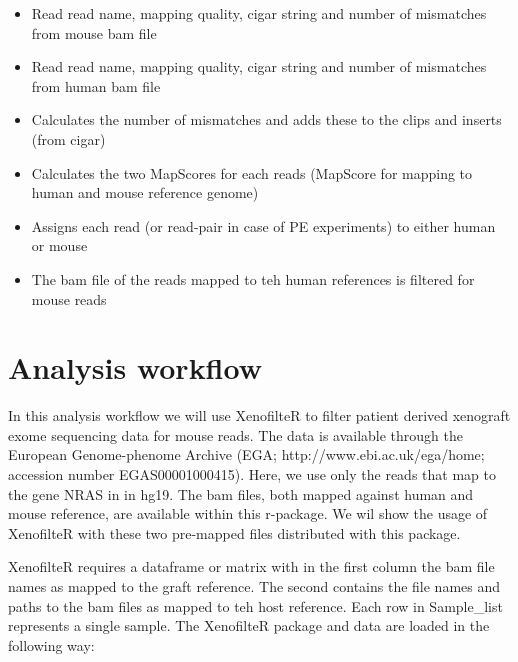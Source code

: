 \documentclass{article}
\begin{document}
\begin{itemize}
    \item Read read name, mapping quality, cigar string and number of mismatches from mouse bam file
    \item Read read name, mapping quality, cigar string and number of mismatches from human bam file
    \item Calculates the number of mismatches and adds these to the clips and inserts (from cigar)
    \item Calculates the two MapScores for each reads (MapScore for mapping to human and mouse reference genome)
    \item Assigns each read (or read-pair in case of PE experiments) to either human or mouse
    \item The bam file of the reads mapped to teh human references is filtered for mouse reads
\end{itemize}

\section{Analysis workflow}

In this analysis workflow we will use XenofilteR to filter patient derived xenograft exome sequencing data for mouse reads. The data is available through the European Genome-phenome Archive (EGA; http://www.ebi.ac.uk/ega/home; accession number EGAS00001000415). Here, we use only the reads that map to the gene NRAS in in hg19. The bam files, both mapped against human and mouse reference, are available within this r-package. We wil show the usage of XenofilteR with these two pre-mapped files distributed with this package. 


XenofilteR requires a dataframe or matrix with in the first column the bam file names as mapped to the graft reference. The second contains the file names and paths to the bam files as mapped to teh host reference. Each row in Sample_list represents a single sample. 
The XenofilteR package and data are loaded in the following way: 

\begin{Schunk}
\end{Schunk}
\end{document}
